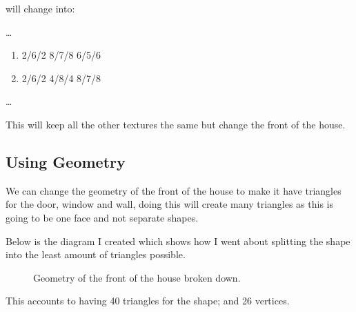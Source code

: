 \documentclass[10pt]{report}
\begin{document}
will change into:

\dots
\begin{enumerate}[f]
    \item 2/6/2 8/7/8 6/5/6
    \item 2/6/2 4/8/4 8/7/8
\end{enumerate}
\dots


This will keep all the other textures the same but change the front of the house.

\subsection{Using Geometry}

We can change the geometry of the front of the house to make it have triangles for the door, window and wall, doing this will create many triangles as this is going to be one face and not separate shapes.

Below is the diagram I created which shows how I went about splitting the shape into the least amount of triangles possible.

\begin{figure}[H]
    \centering
    \caption{Geometry of the front of the house broken down.}
\end{figure}

This accounts to having 40 triangles for the shape; and 26 vertices.
\end{document}
